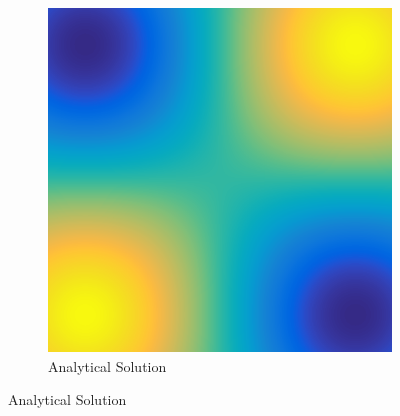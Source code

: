\documentclass[../fem.tex]{subfile}
\begin{document}
\begin{figure}[htpb]
  \centering
  \begin{subfigure}{0.5\textwidth}
    \centering
    \includegraphics[width=0.8\linewidth]{figures/r1a/func.png}
    \caption{Analytical Solution}
  \end{subfigure}


\end{figure}
\end{document}
